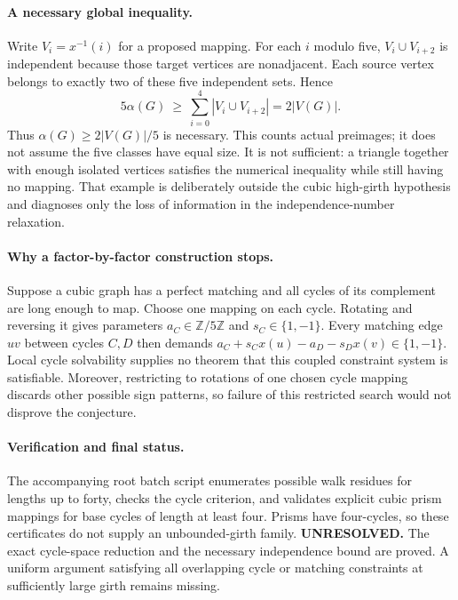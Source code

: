 \documentclass[11pt,a4paper]{article}
\begin{document}
\paragraph{A necessary global inequality.}
Write $V_i=x^{-1}(i)$ for a proposed mapping. For each $i$ modulo five,
$V_i\cup V_{i+2}$ is independent because those target vertices are
nonadjacent. Each source vertex belongs to exactly two of these five
independent sets. Hence
\[
 5\alpha(G)\ \ge\ \sum_{i=0}^4|V_i\cup V_{i+2}|=2|V(G)|.
\]
Thus $\alpha(G)\ge2|V(G)|/5$ is necessary. This counts actual preimages;
it does not assume the five classes have equal size. It is not sufficient:
a triangle together with enough isolated vertices satisfies the numerical
inequality while still having no mapping. That example is deliberately
outside the cubic high-girth hypothesis and diagnoses only the loss of
information in the independence-number relaxation.

\paragraph{Why a factor-by-factor construction stops.}
Suppose a cubic graph has a perfect matching and all cycles of its
complement are long enough to map. Choose one mapping on each cycle.
Rotating and reversing it gives parameters $a_C\in\mathbb Z/5\mathbb Z$
and $s_C\in\{1,-1\}$. Every matching edge $uv$ between cycles $C,D$
then demands
$a_C+s_Cx(u)-a_D-s_Dx(v)\in\{1,-1\}$.
Local cycle solvability supplies no theorem that this coupled constraint
system is satisfiable. Moreover, restricting to rotations of one chosen
cycle mapping discards other possible sign patterns, so failure of this
restricted search would not disprove the conjecture.

\paragraph{Verification and final status.}
The accompanying root batch script enumerates possible walk residues for
lengths up to forty, checks the cycle criterion, and validates explicit
cubic prism mappings for base cycles of length at least four. Prisms have
four-cycles, so these certificates do not supply an unbounded-girth family.
\textbf{UNRESOLVED.} The exact cycle-space reduction and the necessary
independence bound are proved. A uniform argument satisfying all overlapping
cycle or matching constraints at sufficiently large girth remains missing.
\end{document}
